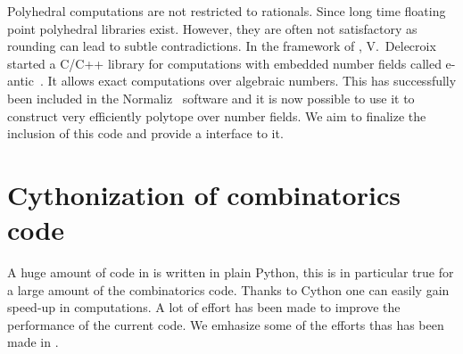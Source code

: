 \documentclass{deliverablereport}
\begin{document}
Polyhedral computations are not restricted to rationals. Since long time
floating point polyhedral libraries exist. However, they are often not
satisfactory as rounding can lead to subtle contradictions. In the framework
of \ODK, V.~Delecroix started a C/C++ library for computations with embedded
number fields called e-antic~\cite{eantic-code}. It allows exact computations
over algebraic numbers. This has successfully been included in the
Normaliz~\cite{normaliz-code} software and it is now possible to use
it to construct very efficiently polytope over number fields. We aim to
finalize the inclusion of this code and provide a \Sage interface to it.


\section{Cythonization of combinatorics code}

A huge amount of code in \Sage is written in plain Python, this is in
particular true for a large amount of the combinatorics code. Thanks to
Cython one can easily gain speed-up in computations. A lot of effort has
been made to improve the performance of the current code. We emhasize
some of the efforts thas has been made in \ODK.
\end{document}
